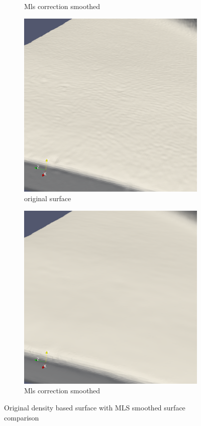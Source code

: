 \begin{figure}
\begin{center}
\begin{subfigure}[b]{0.47\textwidth}
			\caption{Mls correction smoothed}
		\end{subfigure}
		\begin{subfigure}[b]{0.47\textwidth}
			\includegraphics[width=\textwidth]{figures/DDMOriginal4.png}
			\caption{original surface}
		\end{subfigure}\begin{subfigure}[b]{0.47\textwidth}
			\includegraphics[width=\textwidth]{figures/DDMMls4.png}
			\caption{Mls correction smoothed}
		\end{subfigure}
	\end{center}
	\caption{Original density based surface with MLS smoothed surface comparison} \label{fig:db_mls_reconstruction2}
\end{figure}
